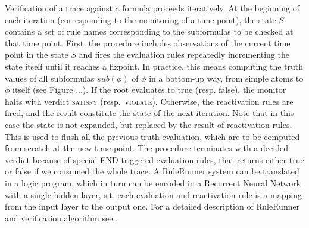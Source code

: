 
Verification of a trace against a formula proceeds iteratively. At the beginning of each iteration (corresponding to the monitoring of a time point), the state $S$ contains a set of rule names corresponding to the subformulas to be checked at that time point. First, the procedure includes observations of the current time point in the state $S$ and fires the evaluation rules repeatedly incrementing the state itself until it reaches a fixpoint. In practice, this means computing the truth values of all subformulas $sub(\phi)$ of $\phi$ in a bottom-up way, from simple atoms to $\phi$ itself (see Figure ...). If the root evaluates to true (resp. false), the monitor halts with verdict \textsc{satisfy} (resp.\ \textsc{violate}). Otherwise, the reactivation rules are fired, and the result constitute the state of the next iteration. Note that in this case the state is not expanded, but replaced by the result of reactivation rules. This is used to flush all the previous truth evaluation, which are to be computed from scratch at the new time point. The procedure terminates with a decided verdict because of special END-triggered evaluation rules, that returns either true or false if we consumed the whole trace.
A RuleRunner system can be translated in a logic program, which in turn can be encoded in a Recurrent Neural Network with a single hidden layer, s.t. each evaluation and reactivation rule is a mapping from the input layer to the output one. For a detailed description of RuleRunner and verification algorithm see \cite{perotti2014neural,perotti2015runtime}.

